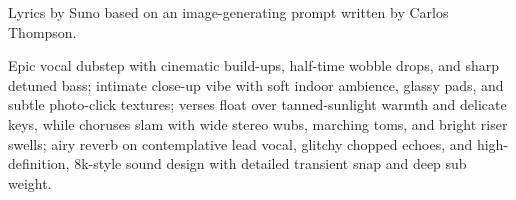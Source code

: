 

\begin{notes}
Lyrics by Suno based on an image-generating prompt written by Carlos Thompson.
\end{notes}
\begin{style}
Epic vocal dubstep with cinematic build-ups, half-time wobble drops, and sharp detuned bass; intimate close-up vibe with soft indoor ambience, glassy pads, and subtle photo-click textures; verses float over tanned-sunlight warmth and delicate keys, while choruses slam with wide stereo wubs, marching toms, and bright riser swells; airy reverb on contemplative lead vocal, glitchy chopped echoes, and high-definition, 8k-style sound design with detailed transient snap and deep sub weight.
\end{style}

